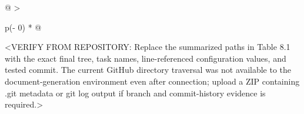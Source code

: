 \begin{longtable}[]{@{}
  >{\raggedright\arraybackslash}p{(\columnwidth - 0\tabcolsep) * }@{}}
\toprule\noalign{}
\begin{minipage}[b]{\linewidth}\raggedright
\textless VERIFY FROM REPOSITORY: Replace the summarized paths in Table
8.1 with the exact final tree, task names, line-referenced configuration
values, and tested commit. The current GitHub directory traversal was
not available to the document-generation environment even after
connection; upload a ZIP containing .git metadata or git log output if
branch and commit-history evidence is required.\textgreater{}
\end{minipage} \\
\midrule\noalign{}
\endhead
\bottomrule\noalign{}
\endlastfoot
\end{longtable}

